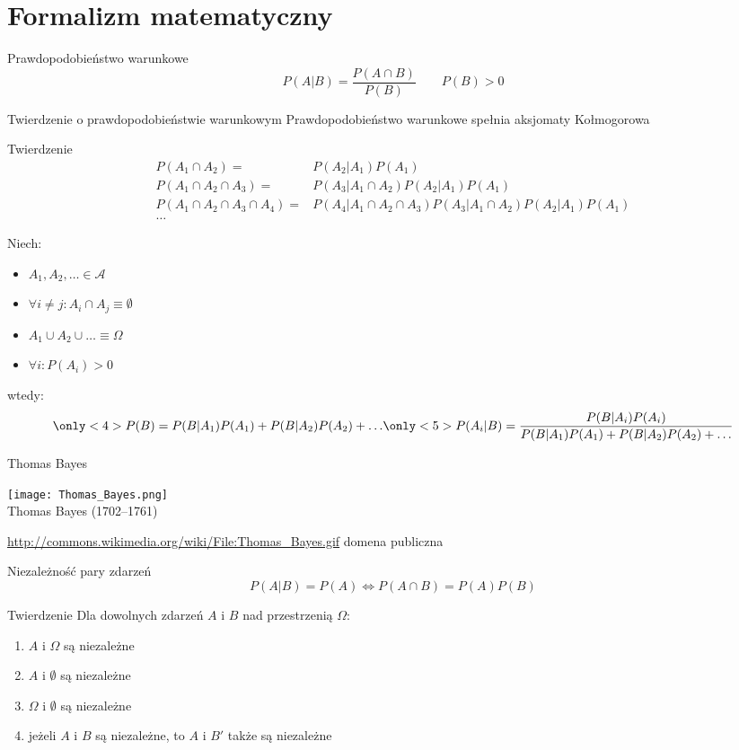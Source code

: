 \documentclass{mp}
\begin{document}
\part{Formalizm matematyczny}
\frame{\partpage}
\begin{frame}{Prawdopodobieństwo warunkowe}
\[ P(A|B)=\frac{P(A\cap B)}{P(B)} \qquad P(B)>0 \]
{
\begin{block}{Twierdzenie o prawdopodobieństwie warunkowym}
Prawdopodobieństwo warunkowe spełnia aksjomaty Kołmogorowa
\end{block}
}
{
	\begin{block}{Twierdzenie}
	\begin{align*}
		P(A_1 \cap A_2)= & P(A_2|A_1)P(A_1) \\
		P(A_1 \cap A_2 \cap A_3)=& P(A_3|A_1\cap A_2)P(A_2|A_1)P(A_1) \\
		P(A_1 \cap A_2 \cap A_3\cap A_4)=& P(A_4|A_1\cap A_2\cap A_3) P(A_3|A_1\cap A_2)P(A_2|A_1)P(A_1) \\
		\ldots
	\end{align*}
	\end{block}
}
{
\begin{block}{}
Niech:
\begin{itemize}
\item $A_1, A_2, \ldots \in \mathcal{A}$
\item $\forall i\neq j\colon A_i\cap A_j\equiv \emptyset$
\item $A_1\cup A_2\cup \ldots \equiv \Omega$
\item $\forall i\colon P(A_i)>0$
\end{itemize}
wtedy:
\[
\only<4>{P(B)=P(B|A_1)P(A_1)+P(B|A_2)P(A_2)+\ldots}
\only<5>{P(A_i|B)=\frac{P(B|A_i)P(A_i)}{P(B|A_1)P(A_1)+P(B|A_2)P(A_2)+\ldots}}
\]
\end{block}
}
\end{frame}
\begin{frame}{Thomas Bayes}
\begin{center}
\texttt{[image: Thomas\_Bayes.png]}\\
Thomas Bayes (1702--1761)
\end{center}
{\tiny \url{http://commons.wikimedia.org/wiki/File:Thomas_Bayes.gif} domena publiczna}
\end{frame}
\begin{frame}{Niezależność pary zdarzeń}
\[ P(A|B)=P(A) \iff P(A\cap B)=P(A)P(B) \]
{
\begin{block}{Twierdzenie}
Dla dowolnych zdarzeń $A$ i $B$ nad przestrzenią $\Omega$:
\begin{enumerate}
\item $A$ i $\Omega$ są niezależne
\item $A$ i $\emptyset$ są niezależne
\item $\Omega$ i $\emptyset$ są niezależne
\item jeżeli $A$ i $B$ są niezależne, to $A$ i $B'$ także są niezależne
\end{enumerate}
\end{block}
}
\end{frame}
\end{document}
